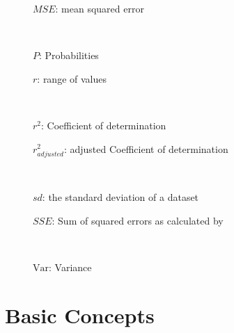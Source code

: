\documentclass[
  a4paper,
]{scrbook}
\begin{document}
\begin{figure}
\begin{minipage}{0.47\linewidth}
\label{mse}{\(MSE\)}: mean squared error\end{minipage}%
%
\begin{minipage}{0.05\linewidth}
~\end{minipage}%
%
\begin{minipage}{0.47\linewidth}
\label{probabilities}{\(P\)}:
Probabilities\end{minipage}%
\newline
\begin{minipage}{0.47\linewidth}
\label{r-gloss}{\(r\)}: range of values\end{minipage}%
%
\begin{minipage}{0.05\linewidth}
~\end{minipage}%
%
\begin{minipage}{0.47\linewidth}
\label{r2}{\(r^2\)}: Coefficient of
determination\end{minipage}%
\newline
\begin{minipage}{0.47\linewidth}
\label{r2adj}{\(r^2_{adjusted}\)}: adjusted Coefficient
of determination\end{minipage}%
%
\begin{minipage}{0.05\linewidth}
~\end{minipage}%
%
\begin{minipage}{0.47\linewidth}
\label{sd-gloss}{\(sd\)}: the standard deviation of a
dataset\end{minipage}%
\newline
\begin{minipage}{0.47\linewidth}
\label{sse}{\(SSE\)}: Sum of squared errors as calculated
by\end{minipage}%
%
\begin{minipage}{0.05\linewidth}
~\end{minipage}%
%
\begin{minipage}{0.47\linewidth}
\label{Var-gloss}{\(\mathrm{Var}\)}:
Variance\end{minipage}%

\end{figure}%

\newpage{}


\chapter{Basic Concepts}\label{basic-concepts}
\end{document}
